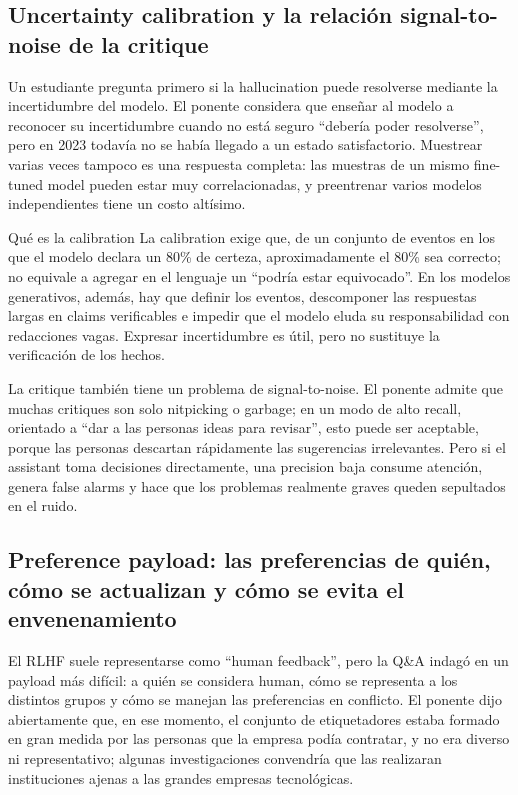 \documentclass[a4paper]{article}
\begin{document}
\subsection{Uncertainty calibration y la relación signal-to-noise de la critique}

Un estudiante pregunta primero si la hallucination puede resolverse mediante la incertidumbre del modelo. El ponente considera que enseñar al modelo a reconocer su incertidumbre cuando no está seguro ``debería poder resolverse'', pero en 2023 todavía no se había llegado a un estado satisfactorio. Muestrear varias veces tampoco es una respuesta completa: las muestras de un mismo fine-tuned model pueden estar muy correlacionadas, y preentrenar varios modelos independientes tiene un costo altísimo.

\begin{warningbox}{Qué es la calibration}
La calibration exige que, de un conjunto de eventos en los que el modelo declara un 80\% de certeza, aproximadamente el 80\% sea correcto; no equivale a agregar en el lenguaje un ``podría estar equivocado''. En los modelos generativos, además, hay que definir los eventos, descomponer las respuestas largas en claims verificables e impedir que el modelo eluda su responsabilidad con redacciones vagas. Expresar incertidumbre es útil, pero no sustituye la verificación de los hechos.
\end{warningbox}

La critique también tiene un problema de signal-to-noise. El ponente admite que muchas critiques son solo nitpicking o garbage; en un modo de alto recall, orientado a ``dar a las personas ideas para revisar'', esto puede ser aceptable, porque las personas descartan rápidamente las sugerencias irrelevantes. Pero si el assistant toma decisiones directamente, una precision baja consume atención, genera false alarms y hace que los problemas realmente graves queden sepultados en el ruido.

\subsection{Preference payload: las preferencias de quién, cómo se actualizan y cómo se evita el envenenamiento}

El RLHF suele representarse como ``human feedback'', pero la Q\&A indagó en un payload más difícil: a quién se considera human, cómo se representa a los distintos grupos y cómo se manejan las preferencias en conflicto. El ponente dijo abiertamente que, en ese momento, el conjunto de etiquetadores estaba formado en gran medida por las personas que la empresa podía contratar, y no era diverso ni representativo; algunas investigaciones convendría que las realizaran instituciones ajenas a las grandes empresas tecnológicas.
\end{document}
